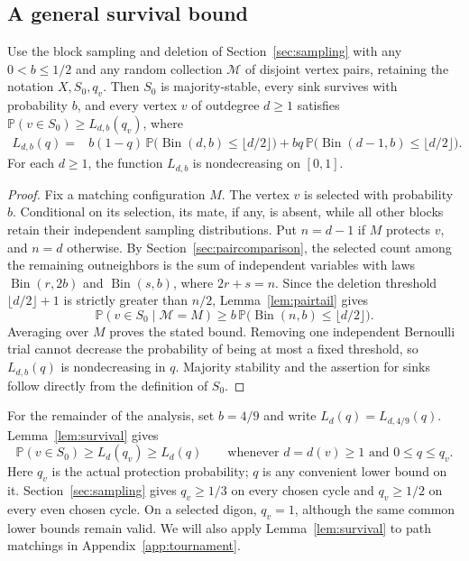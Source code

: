 \documentclass[12pt]{article}
\DeclareMathOperator{\Bin}{Bin}
\newcommand{\Pp}{\mathbb P}
\newcommand{\floor}[1]{\lfloor #1\rfloor}
\begin{document}
\subsection{A general survival bound}\label{sec:selectedvertex}
\begin{lemma}\label{lem:survival}
Use the block sampling and deletion of Section~\ref{sec:sampling}
with any $0<b\le1/2$ and any random collection $\mathcal M$ of
disjoint vertex pairs, retaining the notation $X,S_0,q_v$.
Then $S_0$ is majority-stable, every sink survives with probability
$b$, and every vertex $v$ of outdegree $d\ge1$ satisfies
$\Pp(v\in S_0)\ge L_{d,b}(q_v)$, where
\begin{equation}\label{eq:Ldq}
\begin{aligned}
L_{d,b}(q)={}&b(1-q)\,\Pp\bigl(\Bin(d,b)\le\floor{d/2}\bigr)+bq\,\Pp\bigl(\Bin(d-1,b)\le\floor{d/2}\bigr).
\end{aligned}
\end{equation}
For each $d\ge1$, the function $L_{d,b}$ is nondecreasing on $[0,1]$.
\end{lemma}
\begin{proof}
Fix a matching configuration \(M\). The vertex \(v\) is selected with probability \(b\). Conditional on its selection, its mate, if any, is absent, while all other blocks retain their independent sampling distributions. Put \(n=d-1\) if \(M\) protects \(v\), and \(n=d\) otherwise. By Section~\ref{sec:paircomparison}, the selected count among the remaining outneighbors is the sum of independent variables with laws \(\Bin(r,2b)\) and \(\Bin(s,b)\), where \(2r+s=n\). Since the deletion threshold \(\floor{d/2}+1\) is strictly greater than \(n/2\), Lemma~\ref{lem:pairtail} gives
\[
\Pp(v\in S_0\mid\mathcal M=M)
\ge b\,\Pp\bigl(\Bin(n,b)\le\floor{d/2}\bigr).
\]
Averaging over \(M\) proves the stated bound. Removing one independent Bernoulli trial cannot decrease the probability of being at most a fixed threshold, so \(L_{d,b}(q)\) is nondecreasing in \(q\). Majority stability and the assertion for sinks follow directly from the definition of \(S_0\).
\end{proof}

For the remainder of the analysis, set \(b=4/9\) and write \(L_d(q)=L_{d,4/9}(q)\). Lemma~\ref{lem:survival} gives
\[
\Pp(v\in S_0)\ge L_d(q_v)\ge L_d(q)
\qquad\text{whenever }d=d(v)\ge1\text{ and }0\le q\le q_v.
\]
Here \(q_v\) is the actual protection probability; \(q\) is any convenient lower bound on it. Section~\ref{sec:sampling} gives \(q_v\ge1/3\) on every chosen cycle and \(q_v\ge1/2\) on every even chosen cycle. On a selected digon, \(q_v=1\), although the same common lower bounds remain valid. We will also apply Lemma~\ref{lem:survival} to path matchings in Appendix~\ref{app:tournament}.
\end{document}
